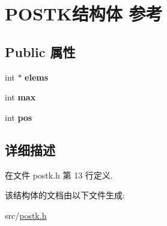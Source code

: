 \hypertarget{structPOSTK}{}\section{P\+O\+S\+T\+K结构体 参考}
\label{structPOSTK}
\subsection*{Public 属性}
\begin{DoxyCompactItemize}
\item 
int $\ast$ {\bfseries elems}\hypertarget{structPOSTK_a03fa273646d4ea4e3961694a5820e96d}{}\label{structPOSTK_a03fa273646d4ea4e3961694a5820e96d}

\item 
int {\bfseries max}\hypertarget{structPOSTK_a6ab28fe045a6fa3ad9686440ae25770f}{}\label{structPOSTK_a6ab28fe045a6fa3ad9686440ae25770f}

\item 
int {\bfseries pos}\hypertarget{structPOSTK_abdfaae2468a5aabeb5438b67cfe2bbc4}{}\label{structPOSTK_abdfaae2468a5aabeb5438b67cfe2bbc4}

\end{DoxyCompactItemize}


\subsection{详细描述}


在文件 postk.\+h 第 13 行定义.



该结构体的文档由以下文件生成\+:\begin{DoxyCompactItemize}
\item 
src/\hyperlink{postk_8h}{postk.\+h}\end{DoxyCompactItemize}
